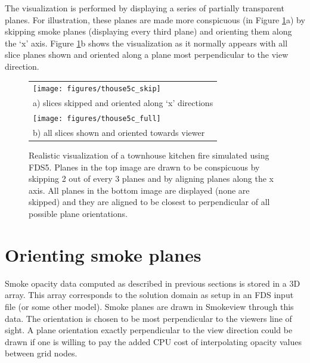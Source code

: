 \documentclass[11pt,twoside]{book}
\newcommand{\figoptions}{htp}
\begin{document}
The visualization is performed by displaying a series of partially
transparent planes. For illustration, these planes are made more
conspicuous (in Figure \ref{figsmoke3d}a) by skipping smoke planes
(displaying every third plane) and orienting them along the `x'
axis. Figure \ref{figsmoke3d}b shows the visualization as it
normally appears with all slice planes shown and oriented along a
plane most perpendicular to the view direction.
\begin{figure}[\figoptions]
\begin{center}
\begin{tabular}{l}
\texttt{[image: figures/thouse5c\_skip]}\\
a) slices skipped and oriented along `x' directions\\
\texttt{[image: figures/thouse5c\_full]}\\
b) all slices shown and oriented towards viewer \\
\end{tabular}
\end{center}
\caption{Realistic visualization of a townhouse kitchen fire simulated
using FDS5. Planes in the top image are drawn to be conspicuous by
skipping 2 out of every 3 planes and by aligning planes along the
x axis. All planes in the bottom image are displayed (none are
skipped) and they are aligned to be closest to perpendicular of
all possible plane orientations.
  }
\label{figsmoke3d}%
\end{figure}

%
%



%
%

\chapter{Orienting smoke planes}

Smoke opacity data computed as described in previous sections is stored in a 3D array.
This array corresponds to the solution domain as setup in an FDS input file (or some other model).
Smoke planes are drawn in Smokeview through this data.  The orientation is chosen to be most perpendicular
to the viewers line of sight.  A plane orientation exactly perpendicular to the view direction could be drawn
if one is willing to pay the added CPU cost of interpolating opacity values between grid nodes.
\end{document}
